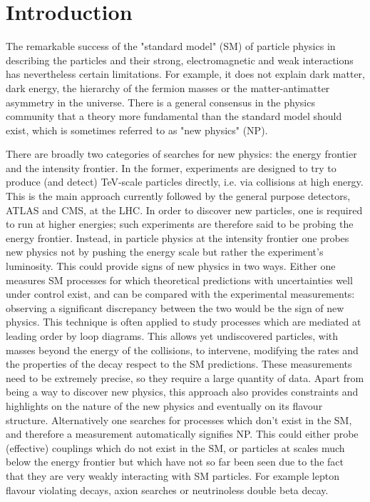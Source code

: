 
\section{Introduction}

The remarkable success of the "standard model" (SM) of particle physics in describing the particles and their strong, electromagnetic and weak interactions has nevertheless certain limitations. For example, it does not explain dark matter, dark energy, the hierarchy of the fermion masses or the matter-antimatter asymmetry in the universe. There is a general consensus in the physics community that a theory more fundamental than the standard model should exist, which is sometimes referred to as "new physics" (NP). 

There are broadly two categories of searches for new physics: the energy frontier and the intensity frontier.  In the former, experiments are designed to try to produce (and detect) TeV-scale particles directly, i.e. via collisions at high energy. This is the main approach currently followed by the general purpose detectors, ATLAS and CMS, at the LHC. 
In order to discover new particles, one is required to run at higher energies;  such experiments are therefore said to be probing the energy frontier.
Instead, in particle physics at the intensity frontier one probes new physics not by pushing the energy scale but rather the experiment's luminosity.
This could provide signs of new physics in two ways. Either one measures SM processes for which theoretical predictions with uncertainties well under control  exist, and can be compared with  the experimental measurements:  observing a significant discrepancy between the two would be the sign of new physics. This technique is often applied to study processes which are mediated at leading order by loop diagrams. This allows yet undiscovered particles, with masses beyond the energy of the collisions, to intervene, modifying the rates and the properties of the decay respect to the SM predictions. These measurements need to be extremely precise, so they require a large quantity of data.  Apart from being a way to discover new physics, this approach  also provides constraints and highlights on the nature of the new physics and eventually on its flavour structure. Alternatively one searches for processes which don't exist in the SM, and therefore a measurement automatically signifies NP. This could either probe (effective) couplings which do not exist in the SM, or particles at scales much below the energy frontier but which have not so far been seen due to the fact that they are very weakly interacting with SM particles. For example lepton flavour violating decays, axion searches or neutrinoless double beta decay.

